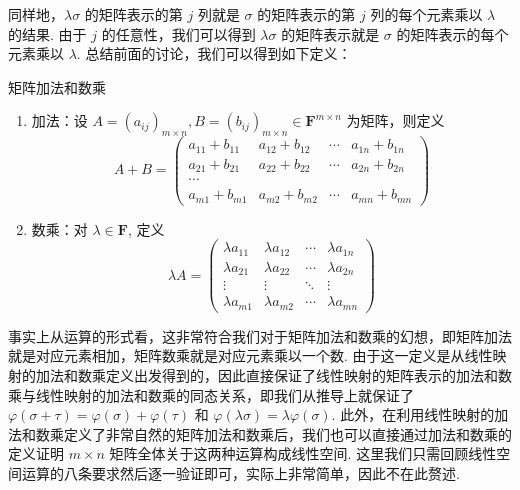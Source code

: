 同样地，$\lambda \sigma$ 的矩阵表示的第 $j$ 列就是 $\sigma$ 的矩阵表示的第 $j$ 列的每个元素乘以 $\lambda$ 的结果. 由于 $j$ 的任意性，我们可以得到 $\lambda \sigma$ 的矩阵表示就是 $\sigma$ 的矩阵表示的每个元素乘以 $\lambda$. 总结前面的讨论，我们可以得到如下定义：

\begin{definition}{矩阵加法和数乘}{}
    \begin{enumerate}
        \item 加法：设 $A = (a_{ij})_{m\times n}, B = (b_{ij})_{m\times n} \in \mathbf{F}^{m\times n}$ 为矩阵，则定义
        \[
            A + B = \begin{pmatrix}
                a_{11} + b_{11} & a_{12} + b_{12} & \cdots & a_{1n} + b_{1n} \\
                a_{21} + b_{21} & a_{22} + b_{22} & \cdots & a_{2n} + b_{2n} \\
                \cdots\\
                a_{m1} + b_{m1} & a_{m2} + b_{m2} & \cdots & a_{mn} + b_{mn}
            \end{pmatrix}
        \]
        \item 数乘：对 $\lambda\in\mathbf{F}$, 定义
        \[
            \lambda A = \begin{pmatrix}
                \lambda a_{11} & \lambda a_{12} & \cdots & \lambda a_{1n} \\
                \lambda a_{21} & \lambda a_{22} & \cdots & \lambda a_{2n} \\
                \vdots & \vdots & \ddots & \vdots \\
                \lambda a_{m1} & \lambda a_{m2} & \cdots & \lambda a_{mn}
            \end{pmatrix}
        \]
    \end{enumerate}
\end{definition}

事实上从运算的形式看，这非常符合我们对于矩阵加法和数乘的幻想，即矩阵加法就是对应元素相加，矩阵数乘就是对应元素乘以一个数. 由于这一定义是从线性映射的加法和数乘定义出发得到的，因此直接保证了线性映射的矩阵表示的加法和数乘与线性映射的加法和数乘的同态关系，即我们从推导上就保证了 $\varphi(\sigma + \tau) = \varphi(\sigma) + \varphi(\tau)$ 和 $\varphi(\lambda \sigma) = \lambda \varphi(\sigma)$. 此外，在利用线性映射的加法和数乘定义了非常自然的矩阵加法和数乘后，我们也可以直接通过加法和数乘的定义证明 $m \times n$ 矩阵全体关于这两种运算构成线性空间. 这里我们只需回顾线性空间运算的八条要求然后逐一验证即可，实际上非常简单，因此不在此赘述.

